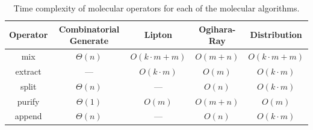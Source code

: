 		\begin{table}[htdp]
				\caption{Time complexity of molecular operators for each of the molecular algorithms.}
				\begin{center}
				\begin{tabular}{|c|c|c|c|c|}
					\hline
					\textbf{ Operator} & {\sc Combinatorial Generate} & {\sc Lipton}           & {\sc Ogihara-Ray}  & {\sc Distribution} \\ \hline
					mix	               & $\Theta(n)$                  & $O(k\cdot m + m)$      & $O(m + n)$         & $O(k\cdot m + m)$ \\
					extract            & ---                          & $O(k\cdot m)$          & $O(m)$             & $O(k\cdot m)$ \\
					split	           & $\Theta(n)$                  & ---                    & $O(n)$             & $O(k\cdot m)$ \\
					purify	           & $\Theta(1)$                  & $O(m)$                 & $O(m + n)$         & $O(m)$ \\
					append	           & $\Theta(n)$                  & ---                    & $O(n)$             & $O(k\cdot m)$ \\
					\hline
				\end{tabular}
				\end{center}
				\label{timeComplexityMolecularOperators}
				\end{table}%
		
			\FloatBarrier		
		
		




		
	
